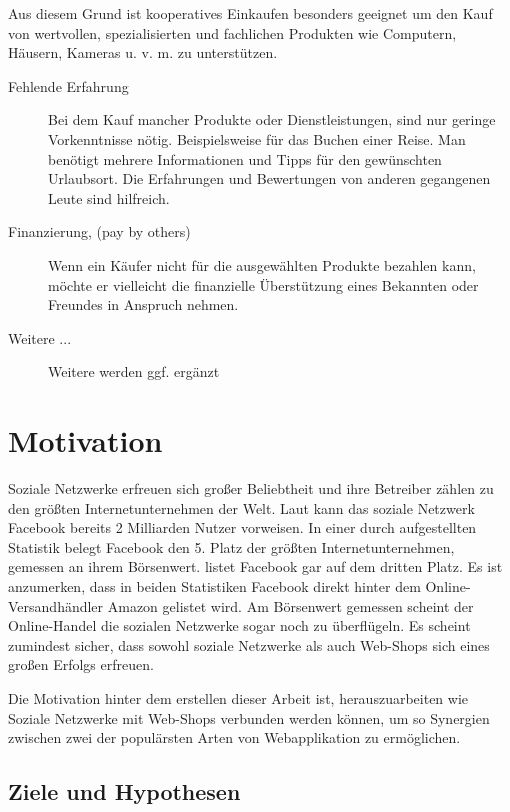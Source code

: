 Aus diesem Grund ist kooperatives Einkaufen besonders geeignet um den Kauf von wertvollen, spezialisierten und fachlichen Produkten wie Computern, Häusern, Kameras u. v. m. zu unterstützen.

\begin{description}
\item[Fehlende Erfahrung] Bei dem Kauf mancher Produkte oder Dienstleistungen, sind nur geringe Vorkenntnisse nötig. Beispielsweise für das Buchen einer Reise. Man benötigt mehrere Informationen und Tipps für den gewünschten Urlaubsort. Die Erfahrungen und Bewertungen von anderen gegangenen Leute sind hilfreich.
\item[Finanzierung, (pay by others)] Wenn ein Käufer nicht für die ausgewählten Produkte bezahlen kann, möchte er vielleicht die finanzielle Überstützung eines Bekannten oder Freundes in Anspruch nehmen.
\item[Weitere ...] Weitere werden ggf. ergänzt
\end{description}


\section{Motivation}

Soziale Netzwerke erfreuen sich großer Beliebtheit und ihre Betreiber zählen zu den größten Internetunternehmen der Welt. Laut \textcite{sokolov:facebook} kann das soziale Netzwerk Facebook bereits 2 Milliarden Nutzer vorweisen. In einer durch \textcite{nasdaq} aufgestellten Statistik belegt Facebook den 5. Platz der größten Internetunternehmen, gemessen an ihrem Börsenwert. \textcite{mittermeier} listet Facebook gar auf dem dritten Platz. Es ist anzumerken, dass in beiden Statistiken Facebook direkt hinter dem Online-Versandhändler Amazon gelistet wird. Am Börsenwert gemessen scheint der Online-Handel die sozialen Netzwerke sogar noch zu überflügeln. Es scheint zumindest sicher, dass sowohl soziale Netzwerke als auch Web-Shops sich eines großen Erfolgs erfreuen.

Die Motivation hinter dem erstellen dieser Arbeit ist, herauszuarbeiten wie Soziale Netzwerke mit Web-Shops verbunden werden können, um so Synergien zwischen zwei der populärsten Arten von Webapplikation zu ermöglichen.


\subsection{Ziele und Hypothesen}

